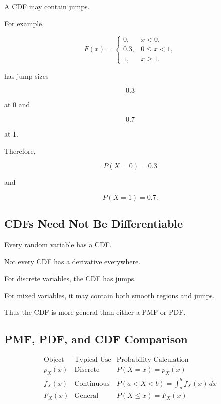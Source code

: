A CDF may contain jumps.

For example,

\[
F(x)
=
\begin{cases}
0,&x<0,\\
0.3,&0\leq x<1,\\
1,&x\geq1.
\end{cases}
\]

has jump sizes

\[
0.3
\]

at \(0\) and

\[
0.7
\]

at \(1\).

Therefore,

\[
P(X=0)=0.3
\]

and

\[
P(X=1)=0.7.
\]

\subsection{CDFs Need Not Be Differentiable}
\label{subsec:cdf-not-differentiable}

Every random variable has a CDF.

Not every CDF has a derivative everywhere.

For discrete variables, the CDF has jumps.

For mixed variables, it may contain both smooth regions and jumps.

Thus the CDF is more general than either a PMF or PDF.

\subsection{PMF, PDF, and CDF Comparison}
\label{subsec:pmf-pdf-cdf-comparison}

\[
\begin{array}{c|c|c}
\text{Object}
&
\text{Typical Use}
&
\text{Probability Calculation}
\\
\hline
p_X(x)
&
\text{Discrete}
&
P(X=x)=p_X(x)
\\[1mm]
f_X(x)
&
\text{Continuous}
&
P(a<X<b)=\displaystyle\int_a^b f_X(x)\,dx
\\[3mm]
F_X(x)
&
\text{General}
&
P(X\leq x)=F_X(x)
\end{array}
\]

